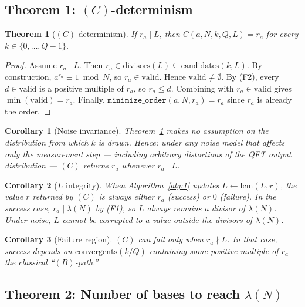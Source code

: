 \documentclass[11pt]{article}
\newtheorem{theorem}{Theorem}
\newtheorem{corollary}{Corollary}
\begin{document}
\subsection{Theorem 1: $(C)$-determinism}

\begin{theorem}[$(C)$-determinism]\label{thm:c-det}
If $r_a \mid L$, then $C(a, N, k, Q, L) = r_a$ for every $k \in \{0, \ldots, Q-1\}$.
\end{theorem}

\begin{proof}
Assume $r_a \mid L$. Then $r_a \in \mathrm{divisors}(L) \subseteq \mathrm{candidates}(k, L)$. By construction, $a^{r_a} \equiv 1 \bmod N$, so $r_a \in \mathrm{valid}$. Hence $\mathrm{valid} \neq \emptyset$. By (F2), every $d \in \mathrm{valid}$ is a positive multiple of $r_a$, so $r_a \leq d$. Combining with $r_a \in \mathrm{valid}$ gives $\min(\mathrm{valid}) = r_a$. Finally, $\texttt{minimize\_order}(a, N, r_a) = r_a$ since $r_a$ is already the order.
\end{proof}

\begin{corollary}[Noise invariance]\label{cor:noise}
Theorem~\ref{thm:c-det} makes no assumption on the distribution from which $k$ is drawn. Hence: under any noise model that affects only the measurement step --- including arbitrary distortions of the QFT output distribution --- $(C)$ returns $r_a$ whenever $r_a \mid L$.
\end{corollary}

\begin{corollary}[$L$ integrity]\label{cor:integrity}
When Algorithm~\ref{alg:1} updates $L \leftarrow \mathrm{lcm}(L, r)$, the value $r$ returned by $(C)$ is always either $r_a$ (success) or $0$ (failure). In the success case, $r_a \mid \lambda(N)$ by (F1), so $L$ always remains a divisor of $\lambda(N)$. Under noise, $L$ cannot be corrupted to a value outside the divisors of $\lambda(N)$.
\end{corollary}

\begin{corollary}[Failure region]\label{cor:failure}
$(C)$ can fail only when $r_a \nmid L$. In that case, success depends on $\mathrm{convergents}(k/Q)$ containing some positive multiple of $r_a$ --- the classical ``$(B)$-path.''
\end{corollary}

\subsection{Theorem 2: Number of bases to reach $\lambda(N)$}
\end{document}
